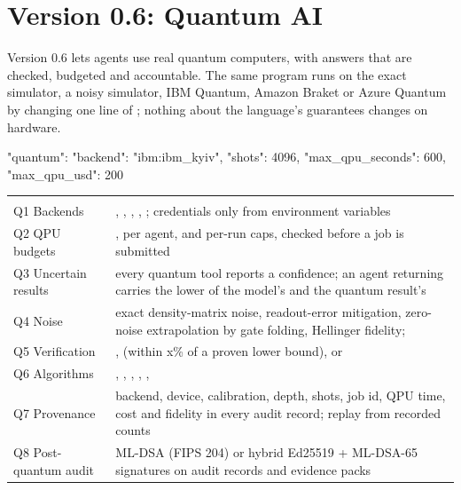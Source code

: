 \chapter{Version 0.6: Quantum AI}
\label{ch:v06}

Version 0.6 lets agents use real quantum computers, with answers that are checked, budgeted and accountable. The same program runs on the exact simulator, a noisy simulator, IBM Quantum, Amazon Braket or Azure Quantum by changing one line of ; nothing about the language's guarantees changes on hardware.

\begin{plaincode}[title=algo.config.json]
"quantum": {"backend": "ibm:ibm_kyiv", "shots": 4096, "max_qpu_seconds": 600, "max_qpu_usd": 200}
\end{plaincode}

\begin{center}
\small
\begin{tabularx}{\linewidth}{@{}L{3.4cm}Y@{}}
\toprule
{} & \\
\goldrule
Q1 Backends & , , , , ; credentials only from environment variables\\
Q2 QPU budgets & ,  per agent, and per-run caps, checked before a job is submitted\\
Q3 Uncertain results & every quantum tool reports a confidence; an agent returning  carries the lower of the model's and the quantum result's\\
Q4 Noise & exact density-matrix noise, readout-error mitigation, zero-noise extrapolation by gate folding, Hellinger fidelity; \\
Q5 Verification & ,  (within x\% of a proven lower bound),  or \\
Q6 Algorithms & , , , , , \\
Q7 Provenance & backend, device, calibration, depth, shots, job id, QPU time, cost and fidelity in every audit record; replay from recorded counts\\
Q8 Post-quantum audit & ML-DSA (FIPS 204) or hybrid Ed25519 + ML-DSA-65 signatures on audit records and evidence packs\\
\bottomrule
\end{tabularx}
\end{center}


